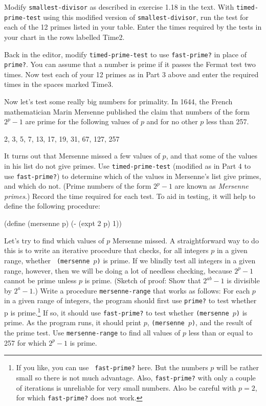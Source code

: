 \labpart Modify {\tt smallest-divisor} as described in exercise
1.18 in the text.  With {\tt timed-prime-test} using this modified
version of {\tt smallest-divisor}, run the test for each of the 12
primes listed in your table.  Enter the times required by the tests in
your chart in the rows labelled Time2.

\labpart Back in the editor, modify {\tt timed-prime-test} to use
{\tt fast-prime?} in place of {\tt prime?}.  You can assume that a number
is prime if it passes the Fermat test two times.  Now test each of
your 12 primes as in Part 3 above and enter the required times in the
spaces marked Time3.

\labpart Now let's test some really big numbers for primality.
In 1644, the French mathematician Marin Mersenne published the claim
that numbers of the form $2^{p}-1$ are prime for the following
values of $p$ and for no other $p$ less than 257.

\begin{center}
2, 3, 5, 7, 13, 17, 19, 31, 67, 127, 257
\end{center}

It turns out that Mersenne missed a few values of $p$, and that some of
the values in his list do not give primes.  Use {\tt timed-prime-test}
(modified as in Part 4 to use {\tt fast-prime?}) to determine which of
the values in Mersenne's list give primes, and which do not.  (Prime
numbers of the form $2^{p}-1$ are known as {\em Mersenne primes}.)
Record the time required for each test.  To aid in testing, it will
help to define the following procedure:

\beginlisp
(define (mersenne p) (- (expt 2 p) 1))
\endlisp

\labpart Let's try to find which values of $p$ Mersenne missed.
A straightforward way to do this is to write an iterative procedure
that checks, for all integers $p$ in a given range, whether {\tt
(mersenne $p$)} is prime.  If we blindly test all integers in a given
range, however, then we will be doing a lot of needless checking,
because $2^{p}-1$ cannot be prime unless $p$ is prime.  (Sketch of
proof: Show that $2^{ab}-1$ is divisible by $2^{a}-1$.)  Write a
procedure {\tt mersenne-range} that works as follows: For each $p$ in
a given range of integers, the program should first use {\tt prime?}
to test whether p is prime.\footnote{If you like, you can use {\tt
fast-prime?} here.  But the numbers $p$ will be rather small so there
is not much advantage.  Also, {\tt fast-prime?} with only a couple of
iterations is unreliable for very small numbers.  Also be careful with
$p = 2$, for which {\tt fast-prime?} does not work.} If so, it should
use {\tt fast-prime?} to test whether {\tt (mersenne $p$)} is prime.
As the program runs, it should print $p$, {\tt (mersenne $p$)}, and
the result of the prime test.  Use {\tt mersenne-range} to find all
values of $p$ less than or equal to 257 for which $2^{p}-1$ is prime.

